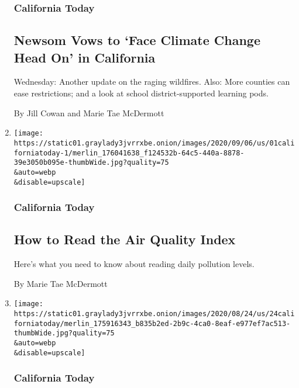 \begin{enumerate}
  \hypertarget{california-today-1}{%
  \subsubsection{California Today}\label{california-today-1}}

  \hypertarget{newsom-vows-to-face-climate-change-head-on-in-california}{%
  \subsection{Newsom Vows to `Face Climate Change Head On' in
  California}\label{newsom-vows-to-face-climate-change-head-on-in-california}}

  Wednesday: Another update on the raging wildfires. Also: More counties
  can ease restrictions; and a look at school district-supported
  learning pods.

  By Jill Cowan and Marie Tae McDermott
\item
  \href{/2020/09/01/us/ca-air-quality-index.html}{}

  \texttt{[image: https://static01.graylady3jvrrxbe.onion/images/2020/09/06/us/01californiatoday-1/merlin\_176041638\_f124532b-64c5-440a-8878-39e3050b095e-thumbWide.jpg?quality=75\\\&auto=webp\\\&disable=upscale]}

  \hypertarget{california-today-2}{%
  \subsubsection{California Today}\label{california-today-2}}

  \hypertarget{how-to-read-the-air-quality-index}{%
  \subsection{How to Read the Air Quality
  Index}\label{how-to-read-the-air-quality-index}}

  Here's what you need to know about reading daily pollution levels.

  By Marie Tae McDermott
\item
  \href{/2020/08/21/us/wildfire-smoke-covid-n95-masks.html}{}

  \texttt{[image: https://static01.graylady3jvrrxbe.onion/images/2020/08/24/us/24californiatoday/merlin\_175916343\_b835b2ed-2b9c-4ca0-8eaf-e977ef7ac513-thumbWide.jpg?quality=75\\\&auto=webp\\\&disable=upscale]}

  \hypertarget{california-today-3}{%
  \subsubsection{California Today}\label{california-today-3}}


\end{enumerate}
